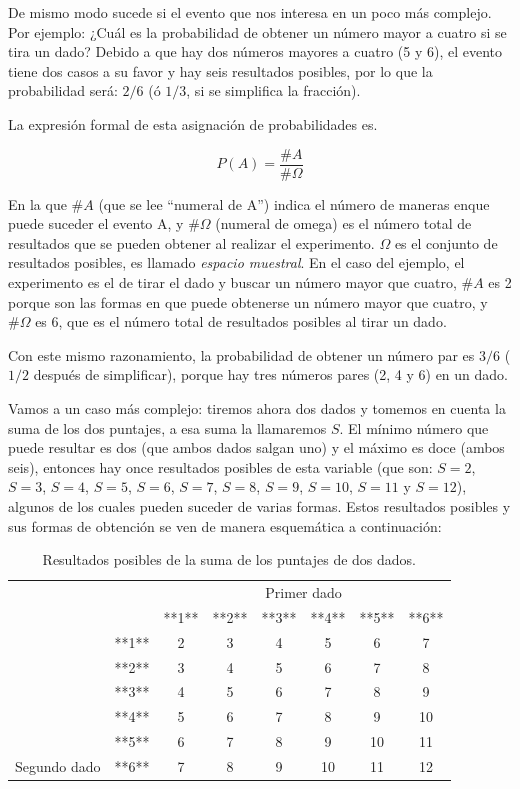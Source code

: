 \documentclass[]{book}
\begin{document}
De mismo modo sucede si el evento que nos interesa en un poco más
complejo. Por ejemplo: ¿Cuál es la probabilidad de obtener un número
mayor a cuatro si se tira un dado? Debido a que hay dos números mayores
a cuatro (5 y 6), el evento tiene dos casos a su favor y hay seis
resultados posibles, por lo que la probabilidad será: \(2/6\) (ó \(1/3\), si se
simplifica la fracción).

La expresión formal de esta asignación de probabilidades es.

\[P(A)=\frac{\#A}{\#\Omega}\]

En la que \(\#A\) (que se lee ``numeral de A'') indica el número de maneras enque puede suceder el evento A, y \(\#\Omega\) (numeral de omega) es el número
total de resultados que se pueden obtener al realizar el experimento. \(\Omega\)
es el conjunto de resultados posibles, es llamado \emph{espacio muestral}. En
el caso del ejemplo, el experimento es el de tirar el dado y buscar un
número mayor que cuatro, \(\#A\) es 2 porque son las formas en que puede
obtenerse un número mayor que cuatro, y \(\#\Omega\) es 6, que es el número total
de resultados posibles al tirar un dado.

Con este mismo razonamiento, la probabilidad de obtener un número par es
\(3/6\) (\(1/2\) después de simplificar), porque hay tres números pares (2, 4 y
6) en un dado.

Vamos a un caso más complejo: tiremos ahora dos dados y tomemos en
cuenta la suma de los dos puntajes, a esa suma la llamaremos \(S\). El
mínimo número que puede resultar es dos (que ambos dados salgan uno) y
el máximo es doce (ambos seis), entonces hay once resultados posibles de
esta variable (que son: \(S = 2\), \(S = 3\), \(S = 4\), \(S = 5\), \(S = 6\), \(S = 7\), \(S = 8\),
\(S = 9\), \(S = 10\), \(S = 11\) y \(S = 12\)), algunos de los cuales pueden suceder de
varias formas. Estos resultados posibles y sus formas de obtención se
ven de manera esquemática a continuación:

\begin{table}

\caption{\label{tab:unnamed-chunk-216}Resultados posibles de la suma de los puntajes de dos dados.}
\centering
\begin{tabular}[t]{lccccccc}
\toprule
\multicolumn{2}{c}{ } & \multicolumn{6}{c}{Primer dado} \\
\cmidrule(l{3pt}r{3pt}){3-8}
 &  & **1** & **2** & **3** & **4** & **5** & **6**\\
\midrule
\rowcolor{gray!6}   & **1** & 2 & 3 & 4 & 5 & 6 & 7\\
\cmidrule{2-8}
 & **2** & 3 & 4 & 5 & 6 & 7 & 8\\
\cmidrule{2-8}
\rowcolor{gray!6}   & **3** & 4 & 5 & 6 & 7 & 8 & 9\\
\cmidrule{2-8}
 & **4** & 5 & 6 & 7 & 8 & 9 & 10\\
\cmidrule{2-8}
\rowcolor{gray!6}   & **5** & 6 & 7 & 8 & 9 & 10 & 11\\
\cmidrule{2-8}
\multirow[t]{-6}{*}{\raggedright\arraybackslash Segundo dado} & **6** & 7 & 8 & 9 & 10 & 11 & 12\\
\bottomrule
\end{tabular}
\end{table}
\end{document}
